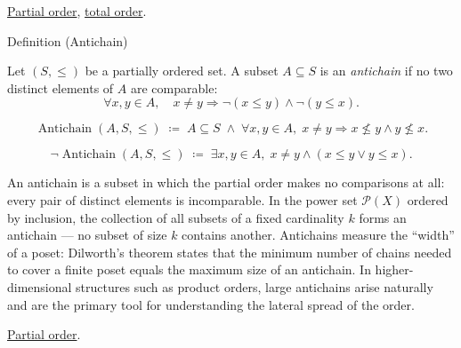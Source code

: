 \begin{remark*}[Dependencies]
\hyperref[def:lattice-order-partial-order]{Partial order},
\hyperref[def:lattice-order-total-order]{total order}.
\end{remark*}


\begin{definitionbox}{Definition (Antichain)}
\begin{definition}[Antichain]
\label{def:antichain}
Let $(S, \leq)$ be a partially ordered set.  A subset $A \subseteq S$ is
an \emph{antichain} if no two distinct elements of $A$ are comparable:
\[
\forall x, y \in A, \quad x \neq y \Longrightarrow \neg(x \leq y) \land \neg(y \leq x).
\]
\end{definition}
\end{definitionbox}

\begin{remark*}
\[
\operatorname{Antichain}(A, S, \leq)
\;\coloneqq\;
A \subseteq S
\;\land\;
\forall x, y \in A,\; x \neq y \Rightarrow x \not\leq y \land y \not\leq x.
\]
\end{remark*}

\begin{remark*}
\[
\neg\operatorname{Antichain}(A, S, \leq)
\;\coloneqq\;
\exists x, y \in A,\; x \neq y \land (x \leq y \lor y \leq x).
\]
\end{remark*}

\begin{remark*}[Interpretation]
An antichain is a subset in which the partial order makes no comparisons at
all: every pair of distinct elements is incomparable.  In the power set
$\mathcal{P}(X)$ ordered by inclusion, the collection of all subsets of
a fixed cardinality $k$ forms an antichain — no subset of size $k$ contains
another.  Antichains measure the ``width'' of a poset: Dilworth's theorem
states that the minimum number of chains needed to cover a finite poset
equals the maximum size of an antichain.  In higher-dimensional structures
such as product orders, large antichains arise naturally and are the primary
tool for understanding the lateral spread of the order.
\end{remark*}

\begin{remark*}[Dependencies]
\hyperref[def:lattice-order-partial-order]{Partial order}.
\end{remark*}
